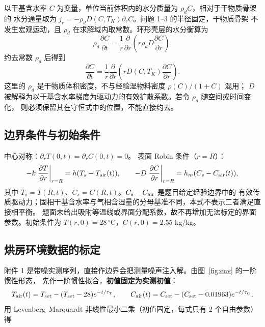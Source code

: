\documentclass[withoutpreface,bwprint]{cumcmthesis}
\begin{document}
以干基含水率 $C$ 为变量，单位当前体积内的水分质量为 $\rho_dC$，相对于干物质骨架的
水分通量取为 $j_r=-\rho_dD(C,T_K)\partial_rC$。问题 1--3 的半径固定，干物质骨架
不发生宏观运动，且 $\rho_d$ 在求解域内取常数。环形壳层的水分衡算为
\[
\rho_d\frac{\partial C}{\partial t}
=\frac{1}{r}\frac{\partial}{\partial r}
\left(r\rho_dD\frac{\partial C}{\partial r}\right).
\]
约去常数 $\rho_d$ 后得到
\begin{equation}
\frac{\partial C}{\partial t}
=\frac{1}{r}\frac{\partial}{\partial r}\left(rD(C,T_K)\frac{\partial C}{\partial r}\right).
\label{eq:mass}
\end{equation}
这里的 $\rho_d$ 是干物质体积密度，不与经验湿物料密度 $\rho(C)/(1+C)$ 混用；
$D$ 被解释为以干基含水率梯度为驱动力的有效扩散系数。若令 $\rho_d$ 随空间或时间变化，
则必须保留其在守恒式中的位置，不能直接约去。

\subsection{边界条件与初始条件}

中心对称：$\partial_rT(0,t)=\partial_rC(0,t)=0$。
表面 Robin 条件（$r=R$）：
\begin{equation}
-k\left.\frac{\partial T}{\partial r}\right|_{r=R}=h(T_s-T_{\rm air}(t)),
\qquad
-D\left.\frac{\partial C}{\partial r}\right|_{r=R}=h_m(C_s-C_{\rm air}(t)),
\label{eq:robin}
\end{equation}
其中 $T_s=T(R,t)$、$C_s=C(R,t)$。$C_s-C_{\rm air}$ 是题目给定经验边界中的
有效传质驱动力；固相干基含水率与气相含湿量的分母基准不同，本式不表示二者满足直接相平衡。
题面未给出吸附等温线或界面分配系数，故不再增加无法标定的界面参数。初始条件为
$T(r,0)=28\,^\circ$C，$C(r,0)=2.55$ kg/kg。

\subsection{烘房环境数据的标定}
\label{sec:calib}

附件 1 是带噪实测序列，直接作边界会把测量噪声注入解。由图~\ref{fig:env} 的一阶惯性形态，
先作一阶惯性拟合，\textbf{初值固定为实测初值}：
\begin{equation}
T_{\rm air}(t)=T_{\rm set}-(T_{\rm set}-28)e^{-t/\tau_T},
\qquad
C_{\rm air}(t)=C_{\rm set}-(C_{\rm set}-0.01963)e^{-t/\tau_C}.
\label{eq:ambient}
\end{equation}
用 Levenberg--Marquardt 非线性最小二乘（初值固定，每式只有 $2$ 个自由参数）得
\end{document}
